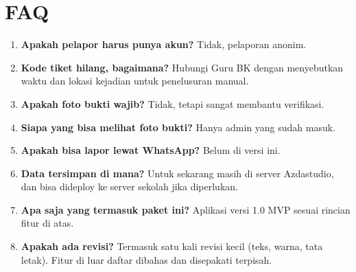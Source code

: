 \documentclass[12pt,a4paper]{article}
\begin{document}
\section{FAQ}
\begin{enumerate}[nosep]
  \item \textbf{Apakah pelapor harus punya akun?} Tidak, pelaporan anonim.
  \item \textbf{Kode tiket hilang, bagaimana?} Hubungi Guru BK dengan menyebutkan
        waktu dan lokasi kejadian untuk penelusuran manual.
  \item \textbf{Apakah foto bukti wajib?} Tidak, tetapi sangat membantu verifikasi.
  \item \textbf{Siapa yang bisa melihat foto bukti?} Hanya admin yang sudah masuk.
  \item \textbf{Apakah bisa lapor lewat WhatsApp?} Belum di versi ini.
  \item \textbf{Data tersimpan di mana?} Untuk sekarang masih di server
        Azdastudio, dan bisa dideploy ke server sekolah jika diperlukan.
  \item \textbf{Apa saja yang termasuk paket ini?} Aplikasi versi 1.0 MVP sesuai
        rincian fitur di atas.
  \item \textbf{Apakah ada revisi?} Termasuk satu kali revisi kecil (teks, warna,
        tata letak). Fitur di luar daftar dibahas dan disepakati terpisah.
\end{enumerate}
\end{document}
